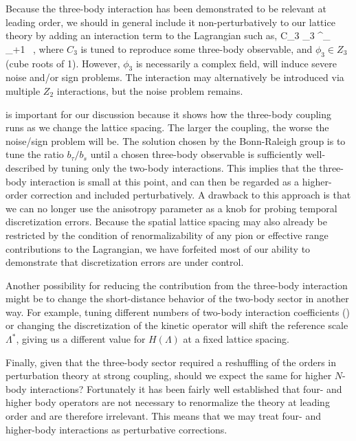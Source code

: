 Because the three-body interaction has been demonstrated to be relevant at leading order, we should in general include it non-perturbatively to our lattice theory by adding an interaction term to the Lagrangian such as,
\beq
C_3 \phi_3 \psi^{\dagger}_{\tau} \psi_{\tau+1} \ ,
\eeq
where $C_3$ is tuned to reproduce some three-body observable, and $\phi_3 \in Z_3$ (cube roots of 1). However, $\phi_3$ is necessarily a complex field, will induce severe noise and/or sign problems. The interaction may alternatively be introduced via multiple $Z_2$ interactions, but the noise problem remains.

 is important for our discussion because it shows how the three-body coupling runs as we change the lattice spacing. The larger the coupling, the worse the noise/sign problem will be. The solution chosen by the Bonn-Raleigh group is to tune the ratio $b_{\tau}/b_s$ until a chosen three-body observable is sufficiently well-described by tuning only the two-body interactions. This implies that the three-body interaction is small at this point, and can then be regarded as a higher-order correction and included perturbatively. A drawback to this approach is that we can no longer use the anisotropy parameter as a knob for probing temporal discretization errors. Because the spatial lattice spacing may also already be restricted by the condition of renormalizability of any pion or effective range contributions to the Lagrangian, we have forfeited most of our ability to demonstrate that discretization errors are under control.

Another possibility for reducing the contribution from the three-body interaction might be to change the short-distance behavior of the two-body sector in another way. For example, tuning different numbers of two-body interaction coefficients () or changing the discretization of the kinetic operator will shift the reference scale $\Lambda^*$, giving us a different value for $H(\Lambda)$ at a fixed lattice spacing.

Finally, given that the three-body sector required a reshuffling of the orders in perturbation theory at strong coupling, should we expect the same for higher $N$-body interactions? Fortunately it has been fairly well established that four- and higher body operators are not necessary to renormalize the theory at leading order and are therefore irrelevant. This means that we may treat four- and higher-body interactions as perturbative corrections.


